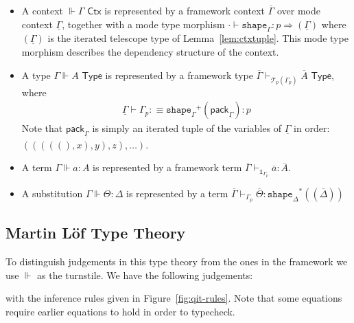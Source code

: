 \documentclass[10pt]{article}
\theoremstyle{definition}
\newcommand{\yields}{\vdash}
\newcommand{\tcell}{\Rightarrow}
\newcommand{\CTX}{\,\,\mathsf{Ctx}}
\newcommand{\TYPE}{\,\,\mathsf{Type}}
\newcommand\St[2]{\ensuremath{{#1}^*(#2)}}
\newcommand\TrPlus[2]{\ensuremath{{#1}^+(#2)}}
\newcommand\El[2]{\mathcal{T}_{#1}(#2)}
\newcommand\ctxtuple[1]{(#1)}
\newcommand\pack[1]{\ensuremath{\mathsf{pack}_{#1}}}
\newcommand{\modeof}[1]{{#1}_p}
\newcommand{\tshape}[1]{\ensuremath{\mathtt{shape}_{#1}}}
\newcommand{\qyields}{\Vdash}
\newcommand{\upstairs}[1]{\overline{#1}}
\newcommand{\downstairs}[1]{\underline{#1}}
\newcommand\One{\ensuremath{\mathds{1}}}
\begin{document}
\begin{itemize}
\item A context $\qyields \Gamma \CTX$ is represented by a framework context $\upstairs{\Gamma}$ over mode context $\downstairs{\Gamma}$, together with a mode type morphism $\cdot \yields \tshape{\Gamma} : p \tcell \ctxtuple{\downstairs{\Gamma}}$ where $\ctxtuple{\downstairs{\Gamma}}$ is the iterated telescope type of Lemma~\ref{lem:ctxtuple}. This mode type morphism describes the dependency structure of the context.
\item A type $\Gamma \qyields A \TYPE$ is represented by a framework type $\upstairs{\Gamma} \yields_{\El{p}{\modeof{\Gamma}}} \upstairs{A} \TYPE$, where
\begin{align*}
\downstairs{\Gamma} \yields \modeof{\Gamma} :\equiv \TrPlus{\tshape{\Gamma}}{\pack{\downstairs{\Gamma}}} : p
\end{align*}
Note that $\pack{\downstairs{\Gamma}}$ is simply an iterated tuple of the variables of $\downstairs{\Gamma}$ in order: $(((((), x), y), z), \dots)$.
\item A term $\Gamma \qyields a : A$ is represented by a framework term $\upstairs{\Gamma} \yields_{\One_{\modeof{\Gamma}}} \upstairs{a} : \upstairs{A}$.
\item A substitution $\Gamma \qyields \Theta : \Delta$ is represented by a term $\upstairs{\Gamma} \yields_{\modeof{\Gamma}} \upstairs{\Theta} : \St{\tshape{\Delta}}{\ctxtuple{\upstairs{\Delta}}}$
\end{itemize}

\subsection{Martin L\"of Type Theory}

To distinguish judgements in this type theory from the ones in the framework we use $\qyields$ as the turnstile. We have the following judgements:
with the inference rules given in Figure~\ref{fig:qit-rules}. Note that some equations require earlier equations to hold in order to typecheck.
\end{document}
